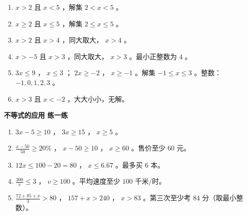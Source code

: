 \begin{answer}
\begin{enumerate}
  \item $x > 2$ 且 $x < 5$ ，解集 $2 < x < 5$ 。
  \item $x \geq 2$ 且 $x \leq 5$ ，解集 $2 \leq x \leq 5$ 。
  \item $x > 2$ 且 $x > 4$ ，同大取大， $x > 4$ 。
  \item $x > -5$ 且 $x > 3$ ，同大取大， $x > 3$ 。最小正整数为 $4$ 。
  \item $3x \leq 9$ ， $x \leq 3$ ； $2x \geq -2$ ， $x \geq -1$ 。解集 $-1 \leq x \leq 3$ 。整数： $-1, 0, 1, 2, 3$ 。
  \item $x > 3$ 且 $x < -2$ ，大大小小，无解。
\end{enumerate}


\textbf{不等式的应用 练一练}

\begin{enumerate}
  \item $3x - 5 \geq 10$ ， $3x \geq 15$ ， $x \geq 5$ 。
  \item $\frac{x - 50}{50} \geq 20\%$ ， $x - 50 \geq 10$ ， $x \geq 60$ 。售价至少 $60$ 元。
  \item $12x \leq 100 - 20 = 80$ ， $x \leq 6.67$ 。最多买 $6$ 本。
  \item $\frac{300}{v} \leq 3$ ， $v \geq 100$ 。平均速度至少 $100$ 千米/时。
  \item $\frac{72 + 85 + x}{3} > 80$ ， $157 + x > 240$ ， $x > 83$ 。第三次至少考 $84$ 分（取最小整数）。
\end{enumerate}


\end{answer}
